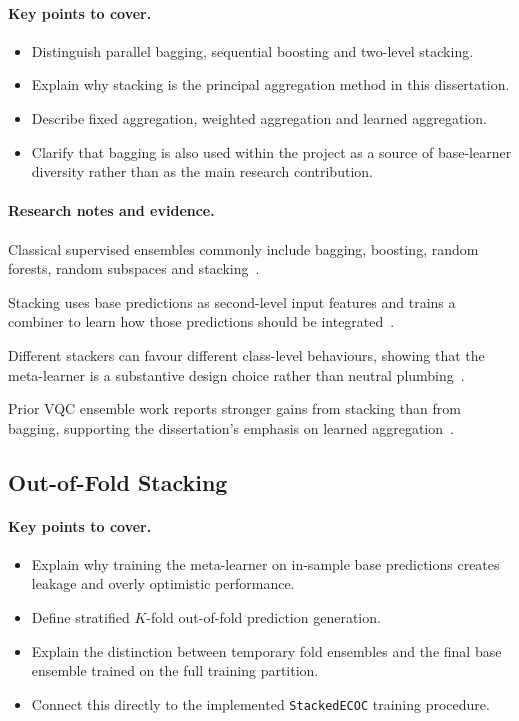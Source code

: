 \documentclass[]{UCD_CS_MSc_AAI_Report}
\newcommand{\method}[1]{{\color{cyan!80!black}#1}}
\newcommand{\result}[1]{{\color{green!60!black}#1}}
\newcommand{\comparison}[1]{{\color{pink!70!violet}#1}}
\newcommand{\sectionbrief}{\paragraph{Key points to cover.}}
\newcommand{\researchnotes}{\paragraph{Research notes and evidence.}}
\begin{document}
\sectionbrief
\begin{itemize}
    \item Distinguish parallel bagging, sequential boosting and two-level stacking.
    \item Explain why stacking is the principal aggregation method in this dissertation.
    \item Describe fixed aggregation, weighted aggregation and learned aggregation.
    \item Clarify that bagging is also used within the project as a source of base-learner diversity rather than as the main research contribution.
\end{itemize}

\researchnotes
\begin{itemize}
    \method{\item Classical supervised ensembles commonly include bagging, boosting, random forests, random subspaces and stacking~\cite{dong_survey_2020}.}
    \method{\item Stacking uses base predictions as second-level input features and trains a combiner to learn how those predictions should be integrated~\cite{demir_modified_2018}.}
    \comparison{\item Different stackers can favour different class-level behaviours, showing that the meta-learner is a substantive design choice rather than neutral plumbing~\cite{demir_modified_2018}.}
    \result{\item Prior VQC ensemble work reports stronger gains from stacking than from bagging, supporting the dissertation's emphasis on learned aggregation~\cite{pinto_composing_2026}.}
\end{itemize}

\subsection{Out-of-Fold Stacking}

\sectionbrief
\begin{itemize}
    \item Explain why training the meta-learner on in-sample base predictions creates leakage and overly optimistic performance.
    \item Define stratified $K$-fold out-of-fold prediction generation.
    \item Explain the distinction between temporary fold ensembles and the final base ensemble trained on the full training partition.
    \item Connect this directly to the implemented \texttt{StackedECOC} training procedure.
\end{itemize}
\end{document}
